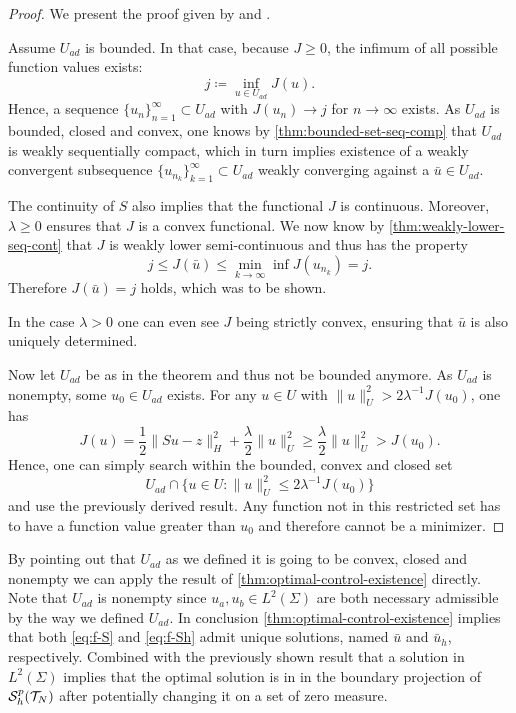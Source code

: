 \documentclass[../thesis.tex]{subfiles}
\begin{document}
\begin{proof}
We present the proof given by \cite[Satz 2.14]{Troeltzsch} and \cite[Satz 2.15]{Troeltzsch}.

Assume $U_{ad}$ is bounded. In that case, because $J \geq 0$, the infimum of all possible function values exists:
\[
	j \coloneqq \inf_{u \in U_{ad}} J(u).
\]
Hence, a sequence $\{ u_n \}_{n=1}^\infty \subset U_{ad}$ with $J(u_n) \to j$ for $n \to \infty$ exists.
As $U_{ad}$ is bounded, closed and convex, one knows by \cref{thm:bounded-set-seq-comp} that $U_{ad}$ is weakly sequentially compact, which in turn implies existence of a weakly convergent subsequence $\{ u_{n_k} \}_{k=1}^\infty \subset U_{ad}$ weakly converging against a $\bar{u} \in U_{ad}$.

The continuity of $S$ also implies that the functional $J$ is continuous.
Moreover, $\lambda \geq 0$ ensures that $J$ is a convex functional.
We now know by \cref{thm:weakly-lower-seq-cont} that $J$ is weakly lower semi-continuous and thus has the property
\[
	j \leq J(\bar{u}) \leq \min_{k \to \infty} \inf J(u_{n_k}) = j.
\]
Therefore $J(\bar{u}) = j$ holds, which was to be shown.

In the case $\lambda > 0$ one can even see $J$ being strictly convex, ensuring that $\bar{u}$ is also uniquely determined.

Now let $U_{ad}$ be as in the theorem and thus not be bounded anymore. As $U_{ad}$ is nonempty, some $u_0 \in U_{ad}$ exists. For any $u \in U$ with $\| u \|_U^2 > 2 \lambda^{-1} J(u_0)$, one has
\[
	J(u) = \frac{1}{2} \| S u - z \|_H^2 + \frac{\lambda}{2} \| u \|_U^2 \geq \frac{\lambda}{2} \| u \|_U^2 > J(u_0).
\]
Hence, one can simply search within the bounded, convex and closed set
\[
	U_{ad} \cap \{ u \in U : \| u \|_U^2 \leq 2 \lambda^{-1} J(u_0) \}
\]
and use the previously derived result. Any function not in this restricted set has to have a function value greater than $u_0$ and therefore cannot be a minimizer.
\end{proof}
By pointing out that $U_{ad}$ as we defined it is going to be convex, closed and nonempty we can apply the result of \cref{thm:optimal-control-existence} directly. Note that $U_{ad}$ is nonempty since $u_a, u_b \in L^2(\Sigma)$ are both necessary admissible by the way we defined $U_{ad}$.
In conclusion \cref{thm:optimal-control-existence} implies that both \cref{eq:f-S} and \cref{eq:f-Sh} admit unique solutions, named $\bar{u}$ and $\bar{u}_h$, respectively.
Combined with the previously shown result that a solution in $L^2(\Sigma)$ implies that the optimal solution is in in the boundary projection of $\mathcal{S}_h^p(\mathcal{T}_N)$ after potentially changing it on a set of zero measure.
\end{document}
